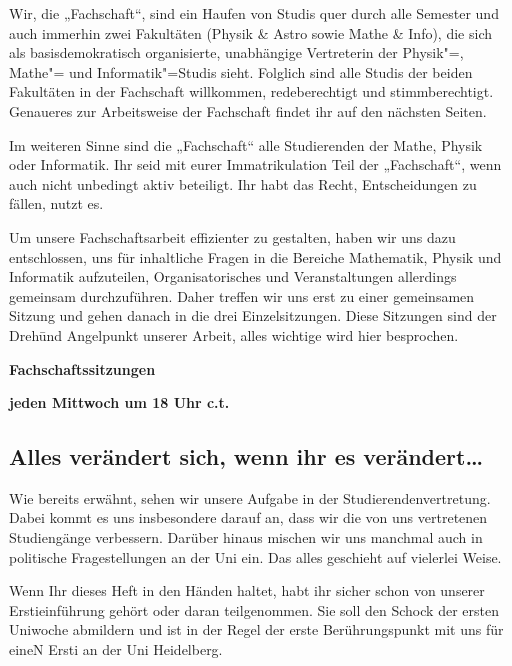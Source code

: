 
Wir, die „Fachschaft“, sind ein Haufen von Studis quer durch alle Semester und
auch immerhin zwei Fakultäten (Physik \& Astro sowie Mathe \& Info), die sich
als basisdemokratisch organisierte, unabhängige Vertreterin der Physik"=,
Mathe"= und Informatik"=Studis sieht. Folglich sind alle Studis der beiden
Fakultäten in der Fachschaft willkommen, redeberechtigt und stimmberechtigt.
Genaueres zur Arbeitsweise der Fachschaft findet ihr auf den nächsten Seiten.

Im weiteren Sinne sind die „Fachschaft“ alle Studierenden der Mathe, Physik
oder Informatik. Ihr seid mit eurer Immatrikulation Teil der „Fachschaft“, wenn
auch nicht unbedingt aktiv beteiligt. Ihr habt das Recht, Entscheidungen zu
fällen, nutzt es.

Um unsere Fachschaftsarbeit effizienter zu gestalten, haben wir uns dazu
entschlossen, uns für inhaltliche Fragen in die Bereiche Mathematik, Physik und
Informatik aufzuteilen, Organisatorisches und Veranstaltungen allerdings
gemeinsam durchzuführen. Daher treffen wir uns erst zu einer gemeinsamen
Sitzung und gehen danach in die drei Einzelsitzungen.  Diese Sitzungen sind der
Dreh\= und Angelpunkt unserer Arbeit, alles wichtige wird hier besprochen.

\begin{center}
\large
\textbf{Fachschaftssitzungen}

\textbf{jeden Mittwoch um 18 Uhr \gls{c.t.}}
\end{center}


\subsection*{Alles verändert sich, wenn ihr es verändert\dots}
Wie bereits erwähnt, sehen wir unsere Aufgabe in der Studierendenvertretung.
Dabei kommt es uns insbesondere darauf an, dass wir die von uns vertretenen
Studiengänge verbessern. Darüber hinaus mischen wir uns manchmal auch in
politische Fragestellungen an der Uni ein. Das alles geschieht auf vielerlei
Weise.

Wenn Ihr dieses Heft in den Händen haltet, habt ihr sicher schon von unserer
Erstieinführung gehört oder daran teilgenommen. Sie soll den Schock der ersten
Uniwoche abmildern und ist in der Regel der erste Berührungspunkt mit uns für
eineN Ersti an der Uni Heidelberg.

